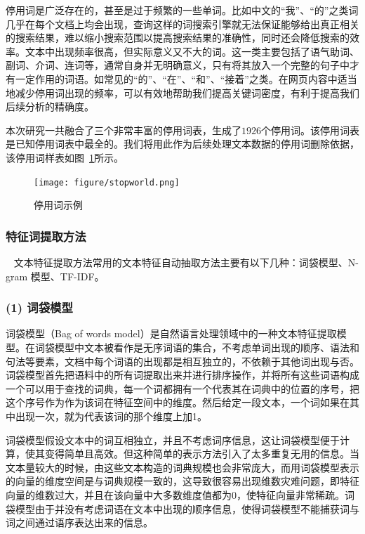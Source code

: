 \documentclass[cs4size,a4paper]{ctexart}
\numberwithin{equation}{section}
\numberwithin{table}{section}
\numberwithin{figure}{section}
\begin{document}
停用词是广泛存在的，甚至是过于频繁的一些单词。比如中文的“我”、“的”之类词几乎在每个文档上均会出现，查询这样的词搜索引擎就无法保证能够给出真正相关的搜索结果，难以缩小搜索范围以提高搜索结果的准确性，同时还会降低搜索的效率。文本中出现频率很高，但实际意义又不大的词。这一类主要包括了语气助词、副词、介词、连词等，通常自身并无明确意义，只有将其放入一个完整的句子中才有一定作用的词语。如常见的“的”、“在”、“和”、“接着”之类。在网页内容中适当地减少停用词出现的频率，可以有效地帮助我们提高关键词密度，有利于提高我们后续分析的精确度。

本次研究一共融合了三个非常丰富的停用词表，生成了$1926$个停用词。该停用词表是已知停用词表中最全的。我们将用此作为后续处理文本数据的停用词删除依据，该停用词样表如图~\ref{fig:stopWorld}所示。

\begin{figure}
  \centering
  \texttt{[image: figure/stopworld.png]}
\caption{停用词示例}\label{fig:stopWorld}
\end{figure}

\subsubsection{特征词提取方法}~\label{subsec:feature}
文本特征提取方法常用的文本特征自动抽取方法主要有以下几种：词袋模型、N-gram 模型、TF-IDF。

\subsubsection*{(1) 词袋模型}

词袋模型（Bag of words model）是自然语言处理领域中的一种文本特征提取模型。在词袋模型中文本被看作是无序词语的集合，不考虑单词出现的顺序、语法和句法等要素，文档中每个词语的出现都是相互独立的，不依赖于其他词出现与否。
词袋模型首先把语料中的所有词提取出来并进行排序操作，并将所有这些词语构成一个可以用于查找的词典，每一个词都拥有一个代表其在词典中的位置的序号，把这个序号作为作为该词在特征空间中的维度。然后给定一段文本，一个词如果在其中出现一次，就为代表该词的那个维度上加1。

词袋模型假设文本中的词互相独立，并且不考虑词序信息，这让词袋模型便于计算，使其变得简单且高效。但这种简单的表示方法引入了太多重复无用的信息。当文本量较大的时候，由这些文本构造的词典规模也会非常庞大，而用词袋模型表示的向量的维度空间是与词典规模一致的，这导致很容易出现维数灾难问题，即特征向量的维数过大，并且在该向量中大多数维度值都为0，使特征向量非常稀疏。词袋模型由于并没有考虑词语在文本中出现的顺序信息，使得词袋模型不能捕获词与词之间通过语序表达出来的信息。
\end{document}

